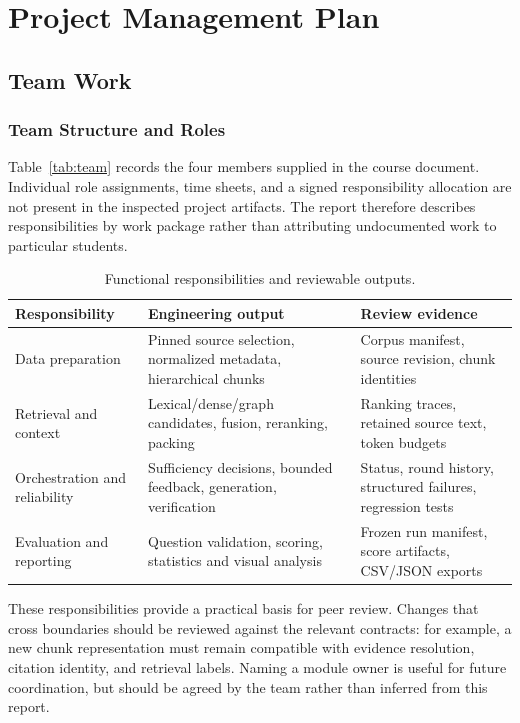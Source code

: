 \chapter{Project Management Plan}
\section{Team Work}
\subsection{Team Structure and Roles}
Table~\ref{tab:team} records the four members supplied in the course document. Individual role assignments, time sheets, and a signed responsibility allocation are not present in the inspected project artifacts. The report therefore describes responsibilities by work package rather than attributing undocumented work to particular students.

\begin{table}[H]\centering\small
\caption{Functional responsibilities and reviewable outputs.}\label{tab:responsibilities}
\begin{tabularx}{\textwidth}{P{3cm}YY}\toprule
\textbf{Responsibility} & \textbf{Engineering output} & \textbf{Review evidence}\\\midrule
Data preparation & Pinned source selection, normalized metadata, hierarchical chunks & Corpus manifest, source revision, chunk identities\\
Retrieval and context & Lexical/dense/graph candidates, fusion, reranking, packing & Ranking traces, retained source text, token budgets\\
Orchestration and reliability & Sufficiency decisions, bounded feedback, generation, verification & Status, round history, structured failures, regression tests\\
Evaluation and reporting & Question validation, scoring, statistics and visual analysis & Frozen run manifest, score artifacts, CSV/JSON exports\\\bottomrule
\end{tabularx}
\end{table}
These responsibilities provide a practical basis for peer review. Changes that cross boundaries should be reviewed against the relevant contracts: for example, a new chunk representation must remain compatible with evidence resolution, citation identity, and retrieval labels. Naming a module owner is useful for future coordination, but should be agreed by the team rather than inferred from this report.

